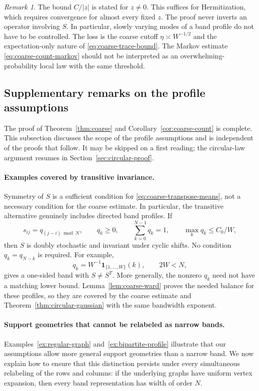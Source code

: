 \documentclass[11pt,reqno]{amsart}
\numberwithin{equation}{section}
\theoremstyle{plain}
\theoremstyle{definition}
\theoremstyle{remark}
\newtheorem{remark}[theorem]{Remark}
\begin{document}
\begin{remark}\label{rem:coarse-scope}
The bound $C/|z|$ is stated for $z\ne0$. This suffices for
Hermitization, which requires convergence for almost every fixed $z$.  The proof never inverts an operator involving $S$.
In particular, slowly varying modes of a band profile do not have to be
controlled.  The loss is the coarse cutoff $\eta\asymp W^{-1/2}$ and
the expectation-only nature of \eqref{eq:coarse-trace-bound}.
The Markov estimate \eqref{eq:coarse-count-markov} should not be
interpreted as an overwhelming-probability local law with the same
threshold.
\end{remark}

\subsection{Supplementary remarks on the profile assumptions}
\label{subsec:profile-balance}

The proof of Theorem~\ref{thm:coarse} and
Corollary~\ref{cor:coarse-count} is complete. This subsection discusses
the scope of the profile assumptions and is independent of the proofs
that follow. It may be skipped on a first reading; the circular-law
argument resumes in Section~\ref{sec:circular-proof}.

\paragraph{Examples covered by transitive invariance.}
Symmetry of $S$ is a sufficient condition for
\eqref{eq:coarse-transpose-means}, not a necessary condition for the
coarse estimate.  In particular, the transitive alternative genuinely
includes directed band profiles.  If
\[
 s_{ij}=q_{(j-i)\bmod N},\qquad q_k\geq0,\qquad
 \sum_{k=0}^{N-1}q_k=1,\qquad \max_kq_k\leq C_0/W,
\]
then $S$ is doubly stochastic and invariant under cyclic shifts.
No condition $q_k=q_{N-k}$ is required.  For example,
\[
 q_k=W^{-1}\mathbf1_{\{1,\ldots,W\}}(k),\qquad 2W<N,
\]
gives a one-sided band with $S\ne S^T$.
More generally, the nonzero $q_k$ need not have a matching lower bound.
Lemma~\ref{lem:coarse-ward} proves the needed balance for these profiles,
so they are covered by the coarse estimate and
Theorem~\ref{thm:circular-gaussian} with the same bandwidth exponent.

\paragraph{Support geometries that cannot be relabeled as narrow bands.}
Examples~\ref{ex:regular-graph} and~\ref{ex:bipartite-profile} illustrate that our assumptions allow more general
support geometries than a narrow band. We now explain how to ensure that
this distinction persists under every simultaneous relabeling of the
rows and columns: if the underlying graphs have uniform vertex expansion,
then every band representation has width of order $N$.
\end{document}
